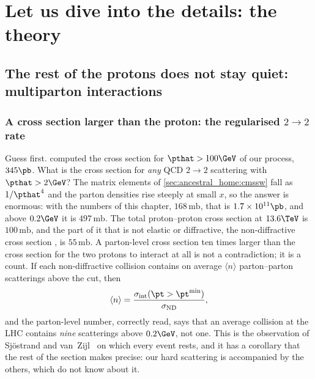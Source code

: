 \section{Let us dive into the details: the theory}
\label{sec:uninvited_cousins:theory}

\subsection{The rest of the protons does not stay quiet: multiparton interactions}
\label{sec:uninvited_cousins:the_rest_of_the_protons_does_not_stay_qu}

\subsubsection{A cross section larger than the proton: the regularised \texorpdfstring{$2\to2$}{2 to 2} rate}
\label{sec:uninvited_cousins:cross_section}

Guess first.  computed the cross section for
$\pthat>100\GeV$ of our process, $345\pb$. What is the cross section for
\emph{any} QCD $2\to2$ scattering with $\pthat>2\GeV$? The matrix elements
of \cref{sec:ancestral_home:cmssw} fall as $1/\pthat^4$ and the parton
densities rise steeply at small $x$, so the answer is enormous: with the
numbers of this chapter, $168\,\mathrm{mb}$, that is $1.7\times10^{11}\pb$,
and above $0.2\GeV$ it is $497\,\mathrm{mb}$. The total proton--proton cross
section at $13.6\TeV$ is $100\,\mathrm{mb}$, and the part of it that is not
elastic or diffractive, the non-diffractive cross section \signd, is
$55\,\mathrm{mb}$. A parton-level cross section ten times larger than the
cross section for the two protons to interact at all is not a
contradiction; it is a count. If each non-diffractive collision contains on
average $\langle n\rangle$ parton--parton scatterings above the cut, then
\begin{equation}
  \langle n\rangle=\frac{\sigint(\pt>\pt^{\min})}{\signd},
  \label{eq:uninvited_cousins:nmean}
\end{equation}
and the parton-level number, correctly read, says that an average collision
at the LHC contains \emph{nine} scatterings above $0.2\GeV$, not one. This
is the observation of Sj\"ostrand and van~Zijl~\cite{Sjostrand:1987su} on
which every \PYTHIA event rests, and it has a corollary that the rest of the
section makes precise: our hard scattering is accompanied by the others,
which do not know about it.

